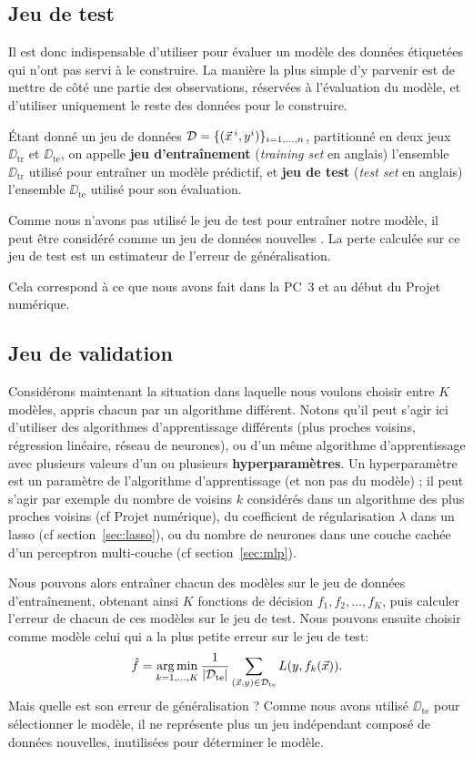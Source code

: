 \subsection{Jeu de test}
Il est donc indispensable d'utiliser pour évaluer un modèle des données
étiquetées qui n'ont pas servi à le construire. La manière la plus simple d'y
parvenir est de mettre de côté une partie des observations, réservées à
l'évaluation du modèle, et d'utiliser uniquement le reste des données pour le
construire.

Étant donné un jeu de données $\DD = \{(\xx^i, y^i)\}_{i=1, \dots, n}$,
partitionné en deux jeux $\DD_{\text{tr}}$ et $\DD_{\text{te}}$, on appelle
\textbf{jeu d'entraînement} (\textit{training set} en anglais) l'ensemble
$\DD_{\text{tr}}$ utilisé pour entraîner un modèle prédictif, et \textbf{jeu de
  test} (\textit{test set} en anglais) l'ensemble $\DD_{\text{te}}$ utilisé pour
son évaluation.

Comme nous n'avons pas utilisé le jeu de test pour entraîner notre modèle, il
peut être considéré comme un jeu de données \og nouvelles \fg. La perte
calculée sur ce jeu de test est un estimateur de l'erreur de généralisation.

Cela correspond à ce que nous avons fait dans la PC~3 et au début du Projet numérique.

\subsection{Jeu de validation}
Considérons maintenant la situation dans laquelle nous voulons choisir entre
$K$ modèles, appris chacun par un algorithme différent. Notons qu'il peut
s'agir ici d'utiliser des algorithmes d'apprentissage différents (plus proches
voisins, régression linéaire, réseau de neurones), ou d'un même algorithme
d'apprentissage avec plusieurs valeurs d'un ou plusieurs
\textbf{hyperparamètres}. Un hyperparamètre est un paramètre de l'algorithme
d'apprentissage (et non pas du modèle) ; il peut s'agir par exemple du nombre
de voisins $k$ considérés dans un algorithme des plus proches voisins (cf Projet numérique), du
coefficient de régularisation $\lambda$ dans un lasso (cf
section~\ref{sec:lasso}), ou du nombre de neurones dans une couche cachée d'un
perceptron multi-couche (cf section~\ref{sec:mlp}).

Nous pouvons alors entraîner chacun des modèles sur le jeu de
données d'entraînement, obtenant ainsi $K$ fonctions de décision
$f_1, f_2, \dots, f_K$, puis calculer l'erreur de chacun de ces modèles sur le
jeu de test. Nous pouvons ensuite choisir comme modèle celui qui a la plus
petite erreur sur le jeu de test:
\begin{equation}
  \hat f = \argmin_{k=1, \dots, K} \frac{1}{|\DD_{\text{te}}|} 
  \sum_{(\xx, y) \in \DD_{\text{te}}} L(y, f_k(\xx)).
\end{equation}
Mais quelle est son erreur de généralisation ? Comme nous avons utilisé
$\DD_{\text{te}}$ pour sélectionner le modèle, il ne représente plus un
jeu indépendant composé de données nouvelles, inutilisées pour déterminer le
modèle.

